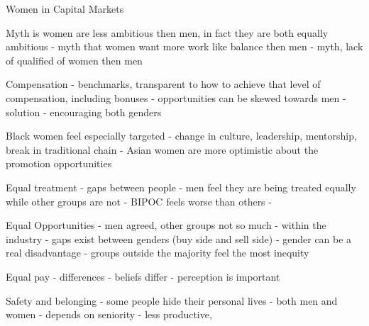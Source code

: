 \documentclass[11pt]{article}
\begin{document}
Women in Capital Markets

Myth is women are less ambitious then men, in fact they are both equally ambitious - myth that women want more work like balance then men - myth, lack of qualified of women then men

Compensation - benchmarks, transparent to how to achieve that level of compensation, including bonuses - opportunities can be skewed towards men - solution - encouraging both genders

Black women feel especially targeted - change in culture, leadership, mentorship, break in traditional chain - Asian women are more optimistic about the promotion opportunities

Equal treatment - gaps between people - men feel they are being treated equally while other groups are not - BIPOC feels worse than others - 

Equal Opportunities - men agreed, other groups not so much - within the industry - gaps exist between genders (buy side and sell side) - gender can be a real disadvantage - groups outside the majority feel the most inequity

Equal pay - differences - beliefs differ - perception is important

Safety and belonging - some people hide their personal lives - both men and women - depends on seniority - less productive, 
\end{document}
